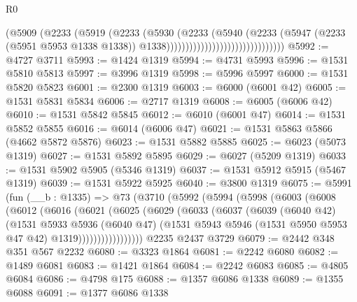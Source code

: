 \begin{lexlean}{R0}
\begin{coremodule}
                                                (@5909
                                                  (@2233
                                                    (@5919
                                                      (@2233
                                                        (@5930
                                                          (@2233
                                                            (@5940
                                                              (@2233
                                                                (@5947
                                                                  (@2233 (@5951 @5953 @1338 @1338))
                                                                  @1338)))))))))))))))))))))))))))))))
@5992 := @4727 @3711
@5993 := @1424 @1319
@5994 := @4731 @5993
@5996 := @1531 @5810 @5813
@5997 := @3996 @1319
@5998 := @5996 @5997
@6000 := @1531 @5820 @5823
@6001 := @2300 @1319
@6003 := @6000 (@6001 @42)
@6005 := @1531 @5831 @5834
@6006 := @2717 @1319
@6008 := @6005 (@6006 @42)
@6010 := @1531 @5842 @5845
@6012 := @6010 (@6001 @47)
@6014 := @1531 @5852 @5855
@6016 := @6014 (@6006 @47)
@6021 := @1531 @5863 @5866 (@4662 @5872 @5876)
@6023 := @1531 @5882 @5885
@6025 := @6023 (@5073 @1319)
@6027 := @1531 @5892 @5895
@6029 := @6027 (@5209 @1319)
@6033 := @1531 @5902 @5905 (@5346 @1319)
@6037 := @1531 @5912 @5915 (@5467 @1319)
@6039 := @1531 @5922 @5925
@6040 := @3800 @1319
@6075 := @5991
    (fun (__b : @1335) =>
    @73
      (@3710
        (@5992
          (@5994
            (@5998
              (@6003
                (@6008
                  (@6012
                    (@6016
                      (@6021
                        (@6025
                          (@6029
                            (@6033
                              (@6037
                                (@6039
                                  (@6040 @42)
                                  (@1531
                                    @5933
                                    @5936
                                    (@6040 @47)
                                    (@1531
                                      @5943
                                      @5946
                                      (@1531 @5950 @5953 @47 @42)
                                      @1319)))))))))))))))))
    @2235
    @2437
    @3729
@6079 := @2442 @348 @351 @567 @2232
@6080 := @3323 @1864
@6081 := @2242 @6080
@6082 := @1489 @6081
@6083 := @1421 @1864
@6084 := @2242 @6083
@6085 := @4805 @6084
@6086 := @4798 @175
@6088 := @1357 @6086 @1338
@6089 := @1355 @6088
@6091 := @1377 @6086 @1338

\end{coremodule}
\end{lexlean}

